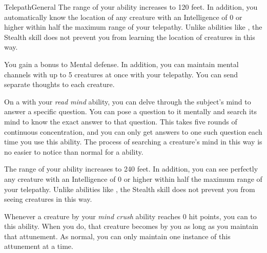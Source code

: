 \begin{feat}{Telepath}{General}
         The range of your  ability increases to 120 feet.
        In addition, you automatically know the location of any creature with an Intelligence of 0 or higher within half the maximum range of your telepathy.
        Unlike abilities like , the Stealth skill does not prevent you from learning the location of creatures in this way.

         You gain a  bonus to Mental defense.
        In addition, you can maintain mental channels with up to 5 creatures at once with your telepathy.
        You can send separate thoughts to each creature.

         On a  with your \textit{read mind} ability, you can delve through the subject's mind to answer a specific question.
        You can pose a question to it mentally and search its mind to know the exact answer to that question.
        This takes five rounds of continuous concentration, and you can only get answers to one such question each time you use this ability.
        The process of searching a creature's mind in this way is no easier to notice than normal for a  ability.

         The range of your  ability increases to 240 feet.
        In addition, you can see perfectly any creature with an Intelligence of 0 or higher within half the maximum range of your telepathy.
        Unlike abilities like , the Stealth skill does not prevent you from seeing creatures in this way.

         Whenever a creature \stunned by your \textit{mind crush} ability reaches 0 hit points, you can  to this ability.
        When you do, that creature becomes \dominated by you as long as you maintain that attunement.
        As normal, you can only maintain one instance of this attunement at a time.
    \end{feat}

